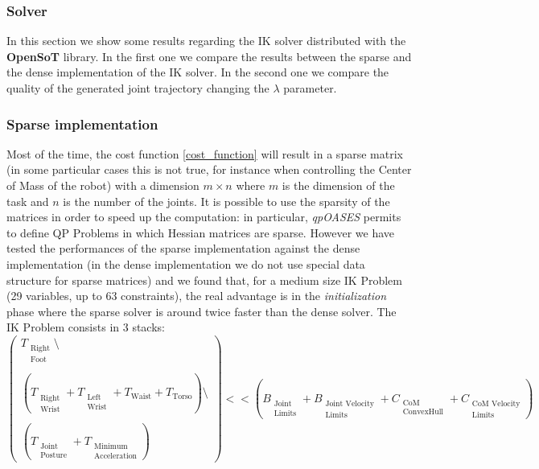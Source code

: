 \subsubsection{Solver}
In this section we show some results regarding the IK solver distributed with the \textbf{OpenSoT} library. In the first one we compare the results between the sparse and the dense implementation of the IK solver. In the second one we compare the quality of the generated joint trajectory changing the $\lambda$ parameter. 

\subsubsection{Sparse implementation}
Most of the time, the cost function \ref{cost_function}
will result in a sparse matrix (in some particular cases this is not true, for instance when controlling the Center of Mass of the robot) with a dimension $m \times n$ where $m$ is the dimension of the task and $n$ is the number of the joints.  
It is possible to use the sparsity of the matrices in order to speed up the computation: in particular, \emph{qpOASES} permits to define QP Problems in which Hessian matrices are sparse. However we have tested the performances of the sparse implementation against the dense implementation (in the dense implementation we do not use special data structure for sparse matrices) and we found that, for a medium size IK Problem (29 variables, up to 63 constraints), the real advantage is in the \emph{initialization} phase where the sparse solver is around twice faster than the dense solver. The IK Problem consists in 3 stacks: 
\begin{equation}
\begin{pmatrix}
T_{\substack{\text{Right}\\\text{Foot}}}\setminus\\
\\
\left(T_{\substack{\text{Right}\\\text{Wrist}}} + T_{\substack{\text{Left}\\\text{Wrist}}} + T_\text{Waist} + T_\text{Torso}\right)\setminus\\ 
\\
\left(T_{\substack{\text{Joint}\\\text{Posture}}} + T_{\substack{\text{Minimum}\\\text{Acceleration}}}\right)
\end{pmatrix}
<< \left(B_{\substack{\text{Joint}\\\text{Limits}}} + B_{\substack{\text{Joint Velocity}\\\text{Limits}}} + C_{\substack{\text{CoM}\\\text{ConvexHull}}} 
+ C_{\substack{\text{CoM Velocity}\\\text{Limits}}}\right)
\end{equation}

